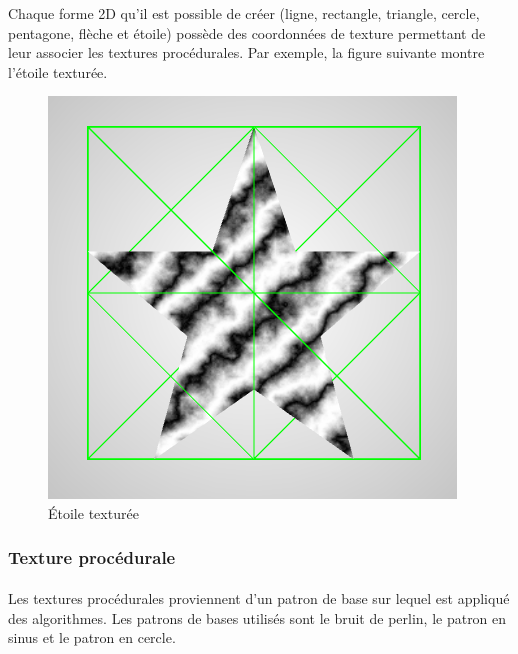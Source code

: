 Chaque forme 2D qu'il est possible de créer (ligne, rectangle, triangle, cercle, pentagone, flèche et étoile) possède des coordonnées de texture permettant de leur associer les textures procédurales.
Par exemple, la figure suivante montre l'étoile texturée.
\begin{figure}[H]
    \centering
	\includegraphics[scale=0.4]{fig/star.PNG}
	\caption{Étoile texturée}
	\label{fig:mapping2}
\end{figure}



\subsubsection{Texture procédurale}
\paragraph{} Les textures procédurales proviennent d'un patron de base sur lequel est appliqué des algorithmes. Les patrons de bases utilisés sont le bruit de perlin, le patron en sinus et le patron en cercle.
